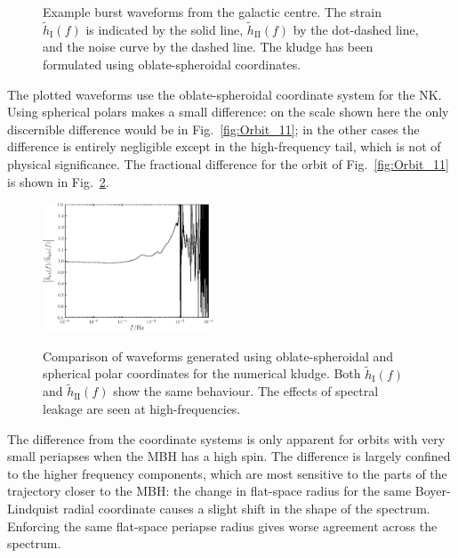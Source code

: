 \documentclass[useAMS,usedcolumn,usegraphicx,usenatbib]{mn2e}
\newcommand{\figref}[1]{Fig.~\ref{fig:#1}}
\newcommand{\sub}[1]{\ensuremath{_\mathrm{#1}}}
\begin{document}
\begin{figure}
\begin{center}
\caption{Example burst waveforms from the galactic centre. The strain $\widetilde{h}\sub{I}(f)$ is indicated by the solid line, $\widetilde{h}\sub{II}(f)$ by the dot-dashed line, and the noise curve by the dashed line. The kludge has been formulated using oblate-spheroidal coordinates.}
  \end{center}
\label{fig:Examples}
\end{figure}

The plotted waveforms use the oblate-spheroidal coordinate system for the NK. Using spherical polars makes a small difference: on the scale shown here the only discernible difference would be in \figref{Orbit_11}; in the other cases the difference is entirely negligible except in the high-frequency tail, which is not of physical significance. The fractional difference for the orbit of \figref{Orbit_11} is shown in \figref{Oblate_sphere}.
\begin{figure}
\begin{center}
 \includegraphics[width=0.45\textwidth]{Fig_ob_sph_11}
 \label{fig:Oblate_sphere}
 \caption{Comparison of waveforms generated using oblate-spheroidal and spherical polar coordinates for the numerical kludge. Both $\widetilde{h}\sub{I}(f)$ and $\widetilde{h}\sub{II}(f)$ show the same behaviour. The effects of spectral leakage are seen at high-frequencies.} 
  \end{center}
\end{figure}
The difference from the coordinate systems is only apparent for orbits with very small periapses when the MBH has a high spin. The difference is largely confined to the higher frequency components, which are most sensitive to the parts of the trajectory closer to the MBH: the change in flat-space radius for the same Boyer-Lindquist radial coordinate causes a slight shift in the shape of the spectrum. Enforcing the same flat-space periapse radius gives worse agreement across the spectrum.
\end{document}
